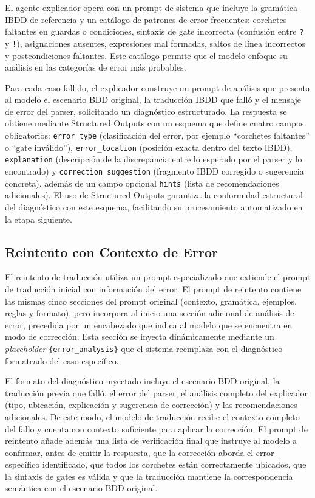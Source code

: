 El agente explicador opera con un prompt de sistema que incluye la gramática IBDD de referencia y un catálogo de patrones de error frecuentes: corchetes faltantes en guardas o condiciones, sintaxis de gate incorrecta (confusión entre \texttt{?} y \texttt{!}), asignaciones ausentes, expresiones mal formadas, saltos de línea incorrectos y postcondiciones faltantes. Este catálogo permite que el modelo enfoque su análisis en las categorías de error más probables.

Para cada caso fallido, el explicador construye un prompt de análisis que presenta al modelo el escenario BDD original, la traducción IBDD que falló y el mensaje de error del parser, solicitando un diagnóstico estructurado. La respuesta se obtiene mediante Structured Outputs con un esquema que define cuatro campos obligatorios: \texttt{error\_type} (clasificación del error, por ejemplo ``corchetes faltantes'' o ``gate inválido''), \texttt{error\_location} (posición exacta dentro del texto IBDD), \texttt{explanation} (descripción de la discrepancia entre lo esperado por el parser y lo encontrado) y \texttt{correction\_suggestion} (fragmento IBDD corregido o sugerencia concreta), además de un campo opcional \texttt{hints} (lista de recomendaciones adicionales). El uso de Structured Outputs garantiza la conformidad estructural del diagnóstico con este esquema, facilitando su procesamiento automatizado en la etapa siguiente.

\subsection{Reintento con Contexto de Error}

El reintento de traducción utiliza un prompt especializado que extiende el prompt de traducción inicial con información del error. El prompt de reintento contiene las mismas cinco secciones del prompt original (contexto, gramática, ejemplos, reglas y formato), pero incorpora al inicio una sección adicional de análisis de error, precedida por un encabezado que indica al modelo que se encuentra en modo de corrección. Esta sección se inyecta dinámicamente mediante un \textit{placeholder} \verb|{error_analysis}| que el sistema reemplaza con el diagnóstico formateado del caso específico.

El formato del diagnóstico inyectado incluye el escenario BDD original, la traducción previa que falló, el error del parser, el análisis completo del explicador (tipo, ubicación, explicación y sugerencia de corrección) y las recomendaciones adicionales. De este modo, el modelo de traducción recibe el contexto completo del fallo y cuenta con contexto suficiente para aplicar la corrección. El prompt de reintento añade además una lista de verificación final que instruye al modelo a confirmar, antes de emitir la respuesta, que la corrección aborda el error específico identificado, que todos los corchetes están correctamente ubicados, que la sintaxis de gates es válida y que la traducción mantiene la correspondencia semántica con el escenario BDD original.

